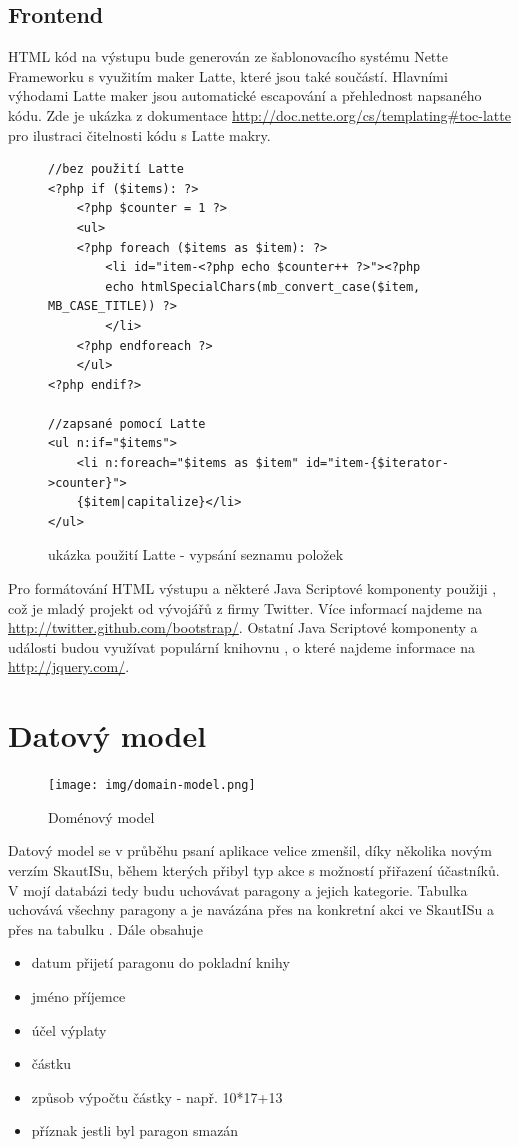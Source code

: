 \documentclass[thesis=B,czech]{FITthesis}[2011/06/14]
\begin{document}
\subsection{Frontend}
HTML kód na výstupu bude generován ze šablonovacího systému Nette Frameworku s využitím maker Latte, které jsou také součástí. Hlavními výhodami Latte maker jsou automatické escapování a přehlednost napsaného kódu. Zde je ukázka z dokumentace \url{http://doc.nette.org/cs/templating#toc-latte} pro ilustraci čitelnosti kódu s Latte makry. 
\begin{figure}[h]
\caption{ukázka použití Latte - vypsání seznamu položek}
\begin{verbatim}
//bez použití Latte
<?php if ($items): ?>
    <?php $counter = 1 ?>
    <ul>
    <?php foreach ($items as $item): ?>
        <li id="item-<?php echo $counter++ ?>"><?php
        echo htmlSpecialChars(mb_convert_case($item, MB_CASE_TITLE)) ?>
        </li>
    <?php endforeach ?>
    </ul>
<?php endif?>

//zapsané pomocí Latte
<ul n:if="$items">
    <li n:foreach="$items as $item" id="item-{$iterator->counter}">
    {$item|capitalize}</li>
</ul>
\end{verbatim}
\end{figure}

Pro formátování HTML výstupu a některé Java Scriptové komponenty použiji , což je mladý projekt od vývojářů z firmy Twitter. Více informací najdeme na \url{http://twitter.github.com/bootstrap/}. Ostatní Java Scriptové komponenty a události budou využívat populární knihovnu , o které najdeme informace na \url{http://jquery.com/}.

\section{Datový model}
\begin{figure}[h] \centering
 	\caption[Doménový model]{Doménový model}\label{fig:domain-model}
	\texttt{[image: img/domain-model.png]}
\end{figure}
Datový model se v průběhu psaní aplikace velice zmenšil, díky několika novým verzím SkautISu, během kterých přibyl typ akce  s možností přiřazení účastníků. V mojí databázi tedy budu uchovávat paragony a jejich kategorie. 
Tabulka  uchovává všechny paragony a je navázána přes  na konkretní akci ve SkautISu a přes  na tabulku . Dále obsahuje 
 \begin{itemize}
 	\item datum přijetí paragonu do pokladní knihy
 	\item jméno příjemce
 	\item účel výplaty
 	\item částku
	\item způsob výpočtu částky - např. 10*17+13
	\item příznak jestli byl paragon smazán
\end{itemize} 
\end{document}

